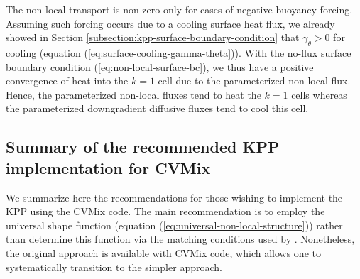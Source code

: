 The non-local transport is non-zero only for cases of negative
buoyancy forcing.  Assuming such forcing occurs due to a cooling
surface heat flux, we already showed in Section
\ref{subsection:kpp-surface-boundary-condition} that $\gamma_{\theta}
> 0$ for cooling (equation (\ref{eq:surface-cooling-gamma-theta})).
With the no-flux surface boundary condition
(\ref{eq:non-local-surface-bc}), we thus have a positive convergence
of heat into the $k=1$ cell due to the parameterized non-local flux.
Hence, the parameterized non-local fluxes tend to heat the $k=1$ cells
whereas the parameterized downgradient diffusive fluxes tend to cool
this cell.

\subsection{Summary of the recommended KPP implementation for CVMix}
\label{subsection:recommended-choices}

We summarize here the recommendations for those wishing to implement
the KPP using the CVMix code.  The main recommendation is to employ
the universal shape function (equation
(\ref{eq:universal-non-local-structure})) rather than determine this
function via the matching conditions used by \cite{LargeKPP}.
Nonetheless, the original approach is available with CVMix code, which
allows one to systematically transition to the simpler approach.

